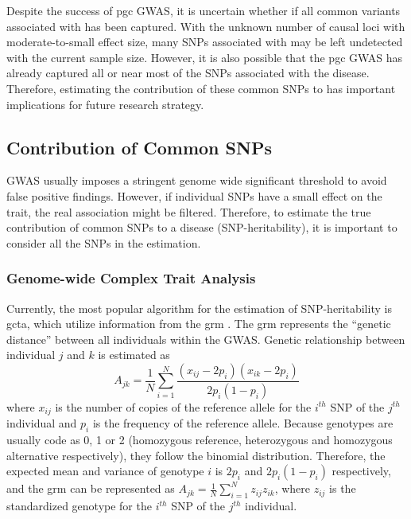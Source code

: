 	
	Despite the success of \gls{pgc}  \gls{GWAS}, it is uncertain whether if all common variants associated with  has been captured. 
	With the unknown number of causal loci with moderate-to-small effect size, many \glspl{SNP} associated with  may be left undetected with the current sample size. 
	However, it is also possible that the \gls{pgc}  \gls{GWAS} has already captured all or near most of the \glspl{SNP} associated with the disease. 
	Therefore, estimating the contribution of these common \glspl{SNP} to  has important implications for future research strategy.
	
	\subsection{Contribution of Common SNPs}
	\gls{GWAS} usually imposes a stringent genome wide significant threshold to avoid false positive findings. 
	However, if individual \glspl{SNP} have a small effect on the trait, the real association might be filtered.
	Therefore, to estimate the true contribution of common \glspl{SNP} to a disease (\gls{SNP}-heritability), it is important to consider all the \glspl{SNP} in the estimation.
	
	\subsubsection{Genome-wide Complex Trait Analysis}
	Currently, the most popular algorithm for the estimation of \gls{SNP}-heritability is \gls{gcta}, which utilize information from the \gls{grm} \citep{Yang2011}.
	The \gls{grm} represents the ``genetic distance'' between all individuals within the \gls{GWAS}.
	Genetic relationship between individual $j$ and $k$ is estimated as 
	\begin{equation}
	A_{jk} = \frac{1}{N}\sum^N_{i=1}\frac{(x_{ij}-2p_i)(x_{ik}-2p_i)}{2p_i(1-p_i)}
	\end{equation}
	where $x_{ij}$ is the number of copies of the reference allele for the $i^{th}$ \gls{SNP} of the $j^{th}$ individual and $p_i$ is the frequency of the reference allele.
	Because genotypes are usually code as 0, 1 or 2 (homozygous reference, heterozygous and homozygous alternative respectively), they follow the binomial distribution.
	Therefore, the expected mean and variance of genotype $i$ is $2p_i$ and $2p_i(1-p_i)$ respectively, and the \gls{grm} can be represented as $A_{jk} = \frac{1}{N}\sum^N_{i=1}z_{ij}z_{ik}$, where $z_{ij}$ is the standardized genotype for the $i^{th}$ \gls{SNP} of the $j^{th}$ individual.
	
